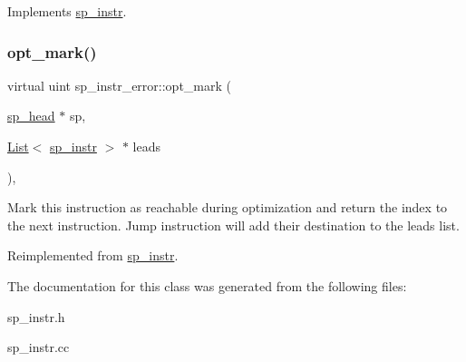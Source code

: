 Implements \mbox{\hyperlink{classsp__instr_a78add2ec1a98f8ba58d75c8eb40ed8cb}{sp\+\_\+instr}}.

\mbox{\label{classsp__instr__error_ac36f346ce3637910ebab73e2e9fa9cf4}} 
\subsubsection{\texorpdfstring{opt\+\_\+mark()}{opt\_mark()}}
{\footnotesize\ttfamily virtual uint sp\+\_\+instr\+\_\+error\+::opt\+\_\+mark (\begin{DoxyParamCaption}\item[{\mbox{\hyperlink{classsp__head}{sp\+\_\+head}} $\ast$}]{sp,  }\item[{\mbox{\hyperlink{classList}{List}}$<$ \mbox{\hyperlink{classsp__instr}{sp\+\_\+instr}} $>$ $\ast$}]{leads }\end{DoxyParamCaption})\hspace{0.3cm}{\ttfamily [inline]}, {\ttfamily [virtual]}}

Mark this instruction as reachable during optimization and return the index to the next instruction. Jump instruction will add their destination to the leads list. 

Reimplemented from \mbox{\hyperlink{classsp__instr_a10b7b33a30316fca4cff5adfe98e282c}{sp\+\_\+instr}}.



The documentation for this class was generated from the following files\+:\begin{DoxyCompactItemize}
\item 
sp\+\_\+instr.\+h\item 
sp\+\_\+instr.\+cc\end{DoxyCompactItemize}
